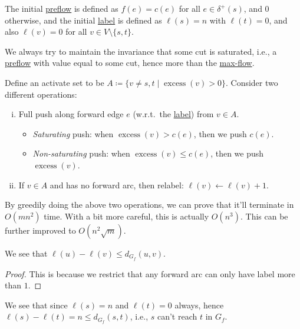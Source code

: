 The initial \hyperref[def:preflow]{preflow} is defined as \(f(e) = c(e)\) for all \(e \in \delta ^+(s)\), and \(0\) otherwise, and the initial \hyperref[def:label]{label} is defined as \(\ell (s) = n\) with \(\ell (t) = 0\), and also \(\ell (v) = 0\) for all \(v \in V \setminus \{ s, t \} \).

\begin{intuition}
	We always try to maintain the invariance that some cut is saturated, i.e., a \hyperref[def:preflow]{preflow} with value equal to some cut, hence more than the \hyperref[prb:s-t-max-flow]{max-flow}.
\end{intuition}

Define an activate set to be \(A \coloneqq \{ v \neq s, t \mid \operatorname{excess}(v) > 0 \} \). Consider two different operations:
\begin{enumerate}[(i)]
	\item Full push along forward edge \(e\) (w.r.t.\ the \hyperref[def:label]{label}) from \(v \in A\).
	      \begin{itemize}
		      \item \emph{Saturating} push: when \(\operatorname{excess}(v) > c(e)\), then we push \(c(e)\).
		      \item \emph{Non-saturating} push: when \(\operatorname{excess}(v) \leq c(e)\), then we push \(\operatorname{excess}(v)\).
	      \end{itemize}
	\item If \(v \in A\) and has no forward arc, then relabel: \(\ell (v) \gets \ell (v) + 1\).
\end{enumerate}

By greedily doing the above two operations, we can prove that it'll terminate in \(O(mn^2)\) time. With a bit more careful, this is actually \(O(n^3)\). This can be further improved to \(O(n^2 \sqrt{m} )\).

\begin{lemma}\label{lma:push-relabel-distance}
	We see that \(\ell (u) - \ell (v) \leq d_{G_f}(u, v)\).
\end{lemma}
\begin{proof}
	This is because we restrict that any forward arc can only have label more than \(1\).
\end{proof}

We see that since \(\ell (s) = n\) and \(\ell (t) = 0\) always, hence \(\ell (s) - \ell (t) = n \leq d_{G_f}(s, t)\), i.e., \(s\) can't reach \(t\) in \(G_f\).

